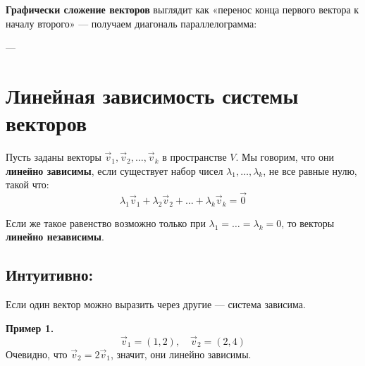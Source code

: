 \textbf{Графически сложение векторов} выглядит как «перенос конца первого вектора к началу второго» — получаем диагональ параллелограмма:

\vspace{1em}
\begin{center}
\end{center}

---

\section{Линейная зависимость системы векторов}

Пусть заданы векторы $\vec{v}_1, \vec{v}_2, \dots, \vec{v}_k$ в пространстве $V$. Мы говорим, что они \textbf{линейно зависимы}, если существует набор чисел $\lambda_1, \dots, \lambda_k$, не все равные нулю, такой что:
\[
\lambda_1 \vec{v}_1 + \lambda_2 \vec{v}_2 + \dots + \lambda_k \vec{v}_k = \vec{0}
\]

Если же такое равенство возможно только при $\lambda_1 = \dots = \lambda_k = 0$, то векторы \textbf{линейно независимы}.

\subsection*{Интуитивно:}
Если один вектор можно выразить через другие — система зависима.

\textbf{Пример 1.}
\[
\vec{v}_1 = (1, 2), \quad \vec{v}_2 = (2, 4)
\]
Очевидно, что $\vec{v}_2 = 2 \vec{v}_1$, значит, они линейно зависимы.

\vspace{1em}
\begin{center}
\end{center}

